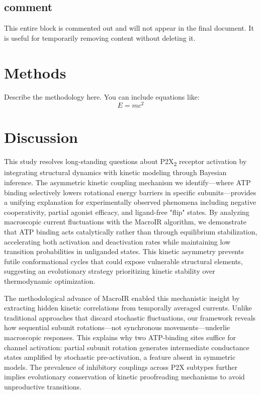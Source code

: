 \documentclass[a4paper,12pt]{article}
\begin{document}
	
	\subsection{comment}
		This entire block is commented out and will not appear in the final document.
		It is useful for temporarily removing content without deleting it.
	
	
	\section{Methods}
	Describe the methodology here. You can include equations like:
	\begin{equation}
		E = mc^2
	\end{equation}
	
	\section{Discussion}
	
	This study resolves long-standing questions about P2X\textsubscript{2} receptor activation by integrating structural dynamics with kinetic modeling through Bayesian inference. The asymmetric kinetic coupling mechanism we identify—where ATP binding selectively lowers rotational energy barriers in specific subunits—provides a unifying explanation for experimentally observed phenomena including negative cooperativity, partial agonist efficacy, and ligand-free "flip" states. By analyzing macroscopic current fluctuations with the MacroIR algorithm, we demonstrate that ATP binding acts catalytically rather than through equilibrium stabilization, accelerating both activation and deactivation rates while maintaining low transition probabilities in unliganded states. This kinetic asymmetry prevents futile conformational cycles that could expose vulnerable structural elements, suggesting an evolutionary strategy prioritizing kinetic stability over thermodynamic optimization.
	
	The methodological advance of MacroIR enabled this mechanistic insight by extracting hidden kinetic correlations from temporally averaged currents. Unlike traditional approaches that discard stochastic fluctuations, our framework reveals how sequential subunit rotations—not synchronous movements—underlie macroscopic responses. This explains why two ATP-binding sites suffice for channel activation: partial subunit rotation generates intermediate conductance states amplified by stochastic pre-activation, a feature absent in symmetric models. The prevalence of inhibitory couplings across P2X subtypes further implies evolutionary conservation of kinetic proofreading mechanisms to avoid unproductive transitions.
	
\end{document}
